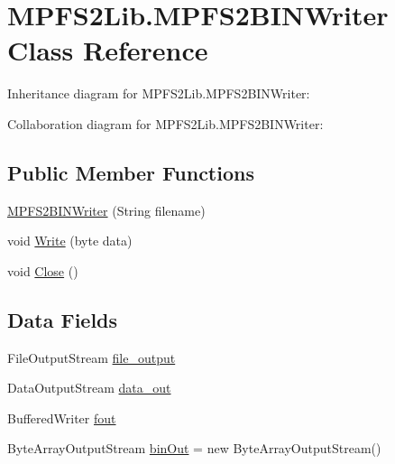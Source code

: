 \hypertarget{class_microchip_m_p_f_s_1_1_m_p_f_s2_lib_1_1_m_p_f_s2_b_i_n_writer}{}\section{M\+P\+F\+S2\+Lib.\+M\+P\+F\+S2\+B\+I\+N\+Writer Class Reference}
\label{class_microchip_m_p_f_s_1_1_m_p_f_s2_lib_1_1_m_p_f_s2_b_i_n_writer}


Inheritance diagram for M\+P\+F\+S2\+Lib.\+M\+P\+F\+S2\+B\+I\+N\+Writer\+:


Collaboration diagram for M\+P\+F\+S2\+Lib.\+M\+P\+F\+S2\+B\+I\+N\+Writer\+:
\subsection*{Public Member Functions}
\begin{DoxyCompactItemize}
\item 
\hyperlink{class_microchip_m_p_f_s_1_1_m_p_f_s2_lib_1_1_m_p_f_s2_b_i_n_writer_aa2f472feb6d14a5295a962ba405fd670}{M\+P\+F\+S2\+B\+I\+N\+Writer} (String filename)
\item 
void \hyperlink{class_microchip_m_p_f_s_1_1_m_p_f_s2_lib_1_1_m_p_f_s2_b_i_n_writer_a9b9d2585120ffb9ce8a6e4f644ee9df7}{Write} (byte data)
\item 
void \hyperlink{class_microchip_m_p_f_s_1_1_m_p_f_s2_lib_1_1_m_p_f_s2_b_i_n_writer_a7f7a3199c392465d0767c6506c1af5b4}{Close} ()
\end{DoxyCompactItemize}
\subsection*{Data Fields}
\begin{DoxyCompactItemize}
\item 
File\+Output\+Stream \hyperlink{class_microchip_m_p_f_s_1_1_m_p_f_s2_lib_1_1_m_p_f_s2_b_i_n_writer_ab03cefa914341b065e79a003ebc36ba5}{file\+\_\+output}
\item 
Data\+Output\+Stream \hyperlink{class_microchip_m_p_f_s_1_1_m_p_f_s2_lib_1_1_m_p_f_s2_b_i_n_writer_aa84dd7c55e2064a5c35cd88bc52176e3}{data\+\_\+out}
\item 
Buffered\+Writer \hyperlink{class_microchip_m_p_f_s_1_1_m_p_f_s2_lib_1_1_m_p_f_s2_b_i_n_writer_aac232ca8514f156a01d70fd44afdd7c1}{fout}
\item 
Byte\+Array\+Output\+Stream \hyperlink{class_microchip_m_p_f_s_1_1_m_p_f_s2_lib_1_1_m_p_f_s2_b_i_n_writer_afb6a3bbdd685629ce65883a134d1403d}{bin\+Out} = new Byte\+Array\+Output\+Stream()
\end{DoxyCompactItemize}


